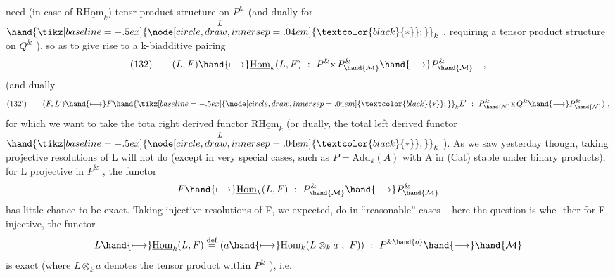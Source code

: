 
need (in case of R$\underline{\mathrm{Hom}}_k$)   tensr product structure on $P^{\&}$ (and dually
for $\overset{L}{\hand{\mathbin{\tikz[baseline=-.5ex]{\node[circle,draw,inner sep=.04em] {\ensuremath{\textcolor{black}{*}}};}}}}_k$ , requiring a tensor product structure on $Q^{\&}$ ), so as to give
rise to a  k-biadditive pairing
\[ (132) \qquad (L,F)\hand{\longmapsto}\underline{\mathrm{Hom}}_k(L,F) \ : \ P^{\&} \mathrm{x}\, P^{\&}_{\hand{\mathcal{M}}} \hand{\longrightarrow} P^{\&}_{\hand{\mathcal{M}}} \quad , \]
(and dually
\[ (132') \qquad (F,L')\hand{\longmapsto} F\hand{\mathbin{\tikz[baseline=-.5ex]{\node[circle,draw,inner sep=.04em] {\ensuremath{\textcolor{black}{*}}};}}}_k L' \ : \ P^{\&}_{\hand{\mathcal{N}}} \mathrm{x}\, Q^{\&} \hand{\longrightarrow} P^{\&}_{\hand{\mathcal{N}}} ) \ , \]
for which we want to take the tota right derived functor R$\underline{\mathrm{Hom}}_k$
(or dually, the total left derived functor $\overset{L}{\hand{\mathbin{\tikz[baseline=-.5ex]{\node[circle,draw,inner sep=.04em] {\ensuremath{\textcolor{black}{*}}};}}}}_k$ ). As we saw yesterday
though, taking projective resolutions of L will not do (except in very
special cases, such as $P = \mathrm{Add}_k(A)$ with A in (Cat) stable under
binary products),   for L projective in $P^{\&}$ , the functor
\[ F \hand{\longmapsto} \underline{\mathrm{Hom}}_k(L,F) \ : \ P^{\&}_{\hand{\mathcal{M}}} \hand{\longrightarrow} P^{\&}_{\hand{\mathcal{M}}} \]
has little chance to be exact. Taking injective resolutions of F\hand{,},  we
expected,  \hand{\uline{\textcolor{black}{would}}} do in ``reasonable'' cases -- here the question is whe-%
ther for F injective, the functor
\[ L \hand{\longmapsto} \underline{\mathrm{Hom}}_k(L,F) \overset{\mathrm{def}}{=} (a \hand{\longmapsto} \mathrm{Hom}_k(L\otimes_k a \ , \ F)) \ : \ P^{\&\hand{o}} \hand{\longrightarrow} \hand{\mathcal{M}} \]
is exact (where $L\otimes_k a$ denotes the  tensor product within $P^{\&}$ ), i.e.
